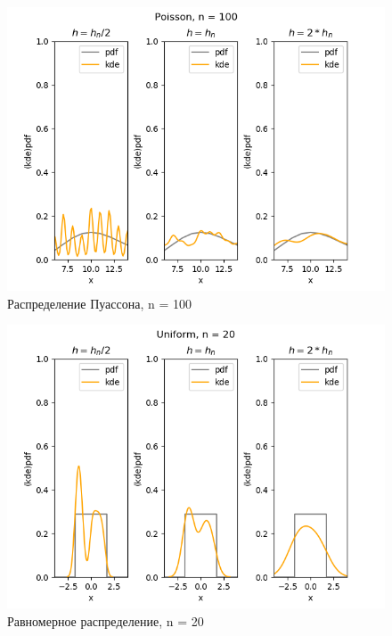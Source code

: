\documentclass[../body.tex]{subfiles}
\begin{document}
\begin{figure}[H]
	\centering
	\includegraphics[width=\textwidth, height =0.4\textheight]{img/PoissonKDE n = 100.png}
	\caption{Распределение Пуассона, n = 100}
	\label{fig:poisson_kde_100}
\end{figure}


\begin{figure}[H]
	\centering
	\includegraphics[width=\textwidth, height =0.4\textheight]{img/UniformKDE n = 20.png}
	\caption{Равномерное распределение, n = 20}
	\label{fig:uniform_kde_20}
\end{figure}
\end{document}
